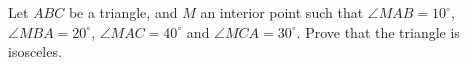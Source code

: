 Let $ABC$ be a triangle, and $M$ an interior point such that $\angle MAB=10^\circ$,  $\angle MBA=20^\circ$,  $\angle MAC=40^\circ$ and $\angle MCA=30^\circ$. Prove that the triangle is isosceles.
